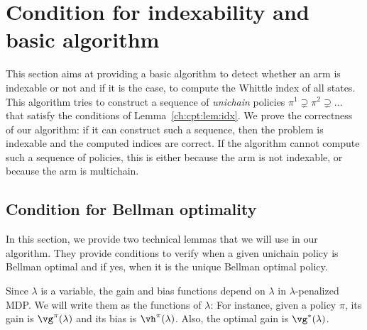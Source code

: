 \section{Condition for indexability and basic algorithm}
\label{sec:widx_compute}

This section aims at providing a basic algorithm to detect whether an arm is indexable or not and if it is the case, to compute the Whittle index of all states.
This algorithm tries to construct a sequence of \emph{unichain} policies $\pi^1\supsetneq \pi^2\supsetneq\dots$ that satisfy the conditions of Lemma~\ref{ch:cpt:lem:idx}.
We prove the correctness of our algorithm: if it can construct such a sequence, then the problem is indexable and the computed indices are correct.
If the algorithm cannot compute such a sequence of policies, this is either because the arm is not indexable, or because the arm is multichain.

\subsection{Condition for Bellman optimality}

In this section, we provide two technical lemmas that we will use in our algorithm. %
They provide conditions to verify when a given unichain policy is Bellman optimal and if yes, when it is the unique Bellman optimal policy.

Since $\lambda$ is a variable, the gain and bias functions depend on $\lambda$ in $\lambda$-penalized MDP.
We will write them as the functions of $\lambda$: For instance, given a policy $\pi$, its gain is $\vg^\pi(\lambda)$ and its bias is $\vh^\pi(\lambda)$. Also, the optimal gain is $\vg^*(\lambda)$.


